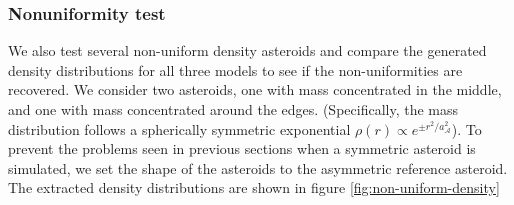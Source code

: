 \documentclass[fleqn,usenatbib]{mnras}
\begin{document}
\subsubsection{Nonuniformity test}
\label{sec:non-uniform-density}

We also test several non-uniform density asteroids and compare the generated density distributions for all three models to see if the non-uniformities are recovered. We consider two asteroids, one with mass concentrated in the middle, and one with mass concentrated around the edges. (Specifically, the mass distribution follows a spherically symmetric exponential $\rho(r) \propto e^{\pm r^2/a_\mathcal{A}^2}$). To prevent the problems seen in previous sections when a symmetric asteroid is simulated, we set the shape of the asteroids to the asymmetric reference asteroid. The extracted density distributions are shown in figure \ref{fig:non-uniform-density}
\end{document}
